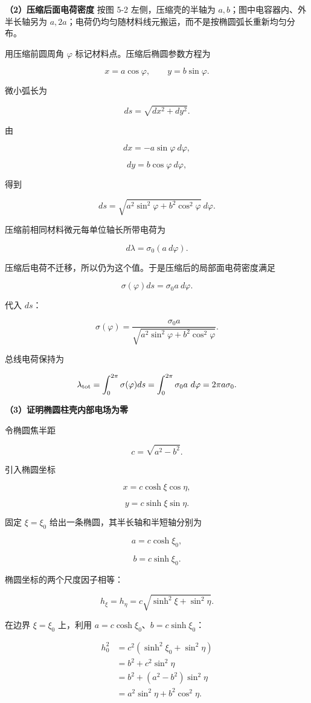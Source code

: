 \documentclass[12pt,a4paper,UTF8]{ctexart}
\begin{document}
\textbf{（2）压缩后面电荷密度} 按图 5-2 左侧，压缩壳的半轴为
\(a,b\)；图中电容器内、外半长轴另为
\(a,2a\)；电荷仍均匀随材料线元搬运，而不是按椭圆弧长重新均匀分布。

用压缩前圆周角 \(\varphi\) 标记材料点。压缩后椭圆参数方程为

\[x=a\cos\varphi,
\qquad y=b\sin\varphi.\]

微小弧长为

\[ds=\sqrt{dx^2+dy^2}.\]

由

\[dx=-a\sin\varphi\ d\varphi,\]

\[dy=b\cos\varphi\ d\varphi,\]

得到

\[ds=\sqrt{a^2\sin^2\varphi+b^2\cos^2\varphi}\ d\varphi.\]

压缩前相同材料微元每单位轴长所带电荷为

\[d\lambda=\sigma_0(a\ d\varphi).\]

压缩后电荷不迁移，所以仍为这个值。于是压缩后的局部面电荷密度满足

\[\sigma(\varphi)ds=\sigma_0a\ d\varphi.\]

代入 \(ds\)：

\[\boxed{
\sigma(\varphi)=
\frac{\sigma_0a}
{\sqrt{a^2\sin^2\varphi+b^2\cos^2\varphi}}
}.\]

总线电荷保持为

\[\lambda_{\rm tot}=\int_0^{2\pi}\sigma(\varphi)ds
=\int_0^{2\pi}\sigma_0a\ d\varphi
=2\pi a\sigma_0.\]

\textbf{（3）证明椭圆柱壳内部电场为零}

令椭圆焦半距

\[c=\sqrt{a^2-b^2}.\]

引入椭圆坐标

\[x=c\cosh\xi\cos\eta,\]

\[y=c\sinh\xi\sin\eta.\]

固定 \(\xi=\xi_0\) 给出一条椭圆，其半长轴和半短轴分别为

\[a=c\cosh\xi_0,\]

\[b=c\sinh\xi_0.\]

椭圆坐标的两个尺度因子相等：

\[h_\xi=h_\eta
=c\sqrt{\sinh^2\xi+\sin^2\eta}.\]

在边界 \(\xi=\xi_0\) 上，利用 \(a=c\cosh\xi_0\)、\(b=c\sinh\xi_0\)：

\[\begin{aligned}
h_0^2
&=c^2(\sinh^2\xi_0+\sin^2\eta)\\
&=b^2+c^2\sin^2\eta\\
&=b^2+(a^2-b^2)\sin^2\eta\\
&=a^2\sin^2\eta+b^2\cos^2\eta.
\end{aligned}\]
\end{document}
